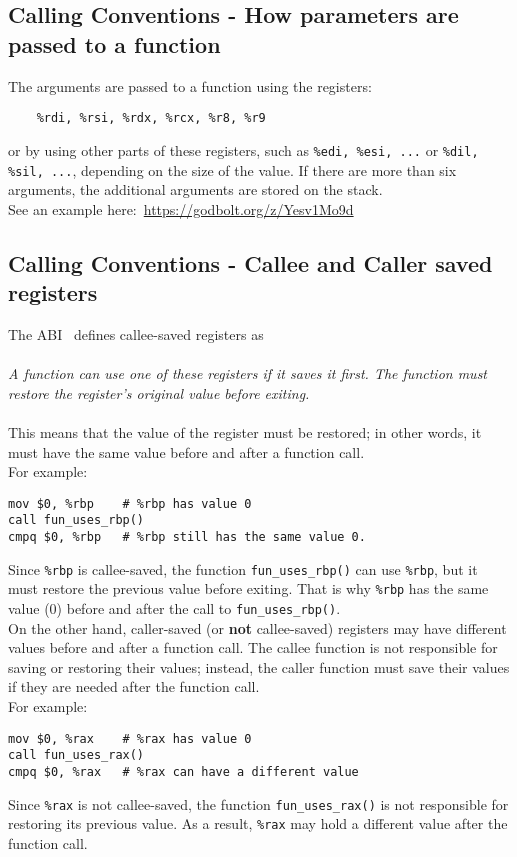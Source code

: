 \subsection{Calling Conventions - How parameters are passed to a function}
%
\label{sec: how-args-passed}
The arguments are passed to a function using the registers:
\begin{verbatim}
    %rdi, %rsi, %rdx, %rcx, %r8, %r9
\end{verbatim}
or by using other parts of these registers, such as \texttt{\%edi, \%esi, ...} or 
\texttt{\%dil, \%sil, ...}, depending on the size of the value. If there are more 
than six arguments, the additional arguments are stored on the stack. \\
See an example here:~\url{https://godbolt.org/z/Yesv1Mo9d} \\
%
\subsection{Calling Conventions - Callee and Caller saved registers}
\label{sec: calle-caller-regs}
%
The ABI~\cite{x86-64-ABI} defines callee-saved registers as \\
\\
%
\textit{A function can use one of these registers if it saves it first. The function 
must restore the register’s original value before exiting.} \\
\\
%
This means that the value of the register must be restored; in other words, it must 
have the same value before and after a function call.  \\
%
\noindent For example:
\begin{verbatim}
mov $0, %rbp    # %rbp has value 0
call fun_uses_rbp()
cmpq $0, %rbp   # %rbp still has the same value 0.
\end{verbatim}
%
Since \texttt{\%rbp} is callee-saved, the function \texttt{fun\_uses\_rbp()} can use
 \texttt{\%rbp}, but it must restore the previous value before exiting. That is why 
 \texttt{\%rbp} has the same value (0) before and after the call to \texttt{fun\_uses\_rbp()}. \\
%
On the other hand, caller-saved (or \textbf{not} callee-saved) registers may have different
 values before and after a function call. The callee function is not responsible for saving
  or restoring their values; instead, the caller function must save their values if they are
   needed after the function call. \\
%
\noindent For example:
\begin{verbatim}
mov $0, %rax    # %rax has value 0
call fun_uses_rax()
cmpq $0, %rax   # %rax can have a different value 
\end{verbatim}
%
Since \texttt{\%rax} is not callee-saved, the function \texttt{fun\_uses\_rax()} is not 
responsible for restoring its previous value. As a result, \texttt{\%rax} may hold a different 
value after the function call.
%
